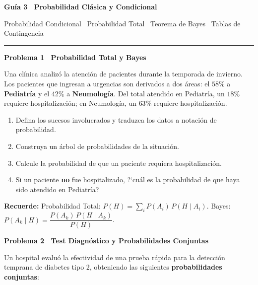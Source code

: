 \documentclass[10pt,letterpaper]{article}
\newcommand{\seccion}[1]{%
  \vspace{2pt}%
  \begin{tcolorbox}[enhanced,colback=white,colframe=black,arc=0pt,boxrule=0pt,
    leftrule=2pt,left=6pt,right=6pt,top=1pt,bottom=1pt]
    {\normalsize\bfseries\sffamily #1}
  \end{tcolorbox}%
  \vspace{1pt}%
}
\newcommand{\reglacaja}[1]{%
  \begin{tcolorbox}[enhanced,colback=white,colframe=black,arc=0pt,boxrule=0.5pt,
    left=6pt,right=6pt,top=2pt,bottom=2pt,breakable]
  \small\sffamily #1
  \end{tcolorbox}%
}
\begin{document}
\thispagestyle{empty}

\begin{center}
  {\fontsize{15}{17}\selectfont\bfseries\sffamily Gu\'ia 3 \textendash\ Probabilidad Cl\'asica y Condicional\par}
  \vspace{0.05cm}
  {\small\sffamily Probabilidad Condicional \textperiodcentered\ Probabilidad Total \textperiodcentered\ Teorema de Bayes \textperiodcentered\ Tablas de Contingencia\par}
  {\rule{3cm}{0.6pt}}
\end{center}

\vspace{0.15cm}

\seccion{Problema 1 \textendash\ Probabilidad Total y Bayes}

\noindent\sffamily\small Una cl\'inica analiz\'o la atenci\'on de pacientes durante la temporada de invierno. Los pacientes que ingresan a urgencias son derivados a dos \'areas: el $58\%$ a \textbf{Pediatr\'ia} y el $42\%$ a \textbf{Neumolog\'ia}. Del total atendido en Pediatr\'ia, un $18\%$ requiere hospitalizaci\'on; en Neumolog\'ia, un $63\%$ requiere hospitalizaci\'on.

\begin{enumerate}[leftmargin=1.2cm, label=\textbf{\alph*)}, itemsep=2pt, topsep=2pt]
  \item Defina los sucesos involucrados y traduzca los datos a notaci\'on de probabilidad.
  \item Construya un \'arbol de probabilidades de la situaci\'on.
  \item Calcule la probabilidad de que un paciente requiera hospitalizaci\'on.
  \item Si un paciente \textbf{no} fue hospitalizado, ?`cu\'al es la probabilidad de que haya sido atendido en Pediatr\'ia?
\end{enumerate}

\reglacaja{%
\textbf{Recuerde:} Probabilidad Total: $P(H)=\sum_i P(A_i)\,P(H\mid A_i)$.\quad
Bayes: $P(A_k\mid H)=\dfrac{P(A_k)\,P(H\mid A_k)}{P(H)}$.%
}

\seccion{Problema 2 \textendash\ Test Diagn\'ostico y Probabilidades Conjuntas}

\noindent\sffamily\small Un hospital evalu\'o la efectividad de una prueba r\'apida para la detecci\'on temprana de diabetes tipo 2, obteniendo las siguientes \textbf{probabilidades conjuntas}:
\end{document}
